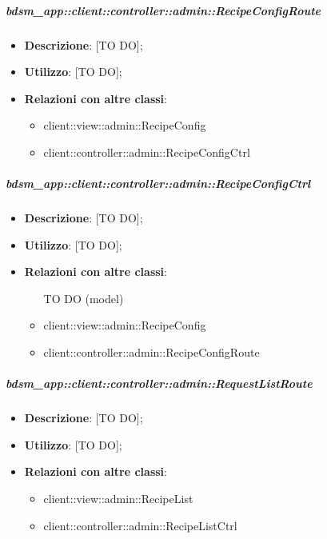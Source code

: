 		\subparagraph{bdsm\_app::client::controller::admin::RecipeConfigRoute} %
		\label{subp:bdsm_app_client_controller_admin_recipeconfigroute}
			\begin{itemize}
				\item \textbf{Descrizione}: [TO DO];
				\item \textbf{Utilizzo}: [TO DO];
				\item \textbf{Relazioni con altre classi}:
					\begin{itemize}
						\item client::view::admin::RecipeConfig
						\item client::controller::admin::RecipeConfigCtrl
					\end{itemize}
			\end{itemize}

		\subparagraph{bdsm\_app::client::controller::admin::RecipeConfigCtrl} %
		\label{subp:bdsm_app_client_controller_admin_recipeconfigctrl}
			\begin{itemize}
				\item \textbf{Descrizione}: [TO DO];
				\item \textbf{Utilizzo}: [TO DO];
				\item \textbf{Relazioni con altre classi}:
					\begin{itemize}
						\item [TO DO] (model)
						\item client::view::admin::RecipeConfig
						\item client::controller::admin::RecipeConfigRoute
					\end{itemize}
			\end{itemize}

		\subparagraph{bdsm\_app::client::controller::admin::RequestListRoute} %
		\label{subp:bdsm_app_client_controller_admin_recipelistroute}
			\begin{itemize}
				\item \textbf{Descrizione}: [TO DO];
				\item \textbf{Utilizzo}: [TO DO];
				\item \textbf{Relazioni con altre classi}:
					\begin{itemize}
						\item client::view::admin::RecipeList
						\item client::controller::admin::RecipeListCtrl
					\end{itemize}
			\end{itemize}

